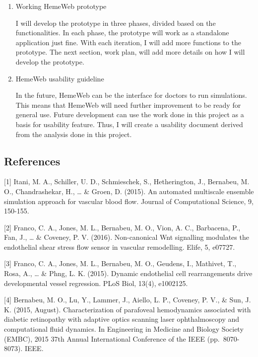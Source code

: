 \documentclass[]{article}
\begin{document}
\begin{enumerate}
\def\labelenumi{\arabic{enumi}.}
\item
  Working HemeWeb prototype

  I will develop the prototype in three phases, divided based on the
  functionalities. In each phase, the prototype will work as a
  standalone application just fine. With each iteration, I will add more
  functions to the prototype. The next section, work plan, will add more
  details on how I will develop the prototype.
\item
  HemeWeb usability guideline

  In the future, HemeWeb can be the interface for doctors to run
  simulations. This means that HemeWeb will need further improvement to
  be ready for general use. Future development can use the work done in
  this project as a basis for usability feature. Thus, I will create a
  usability document derived from the analysis done in this project.
\end{enumerate}

\subsection{References}\label{references}

{[}1{]} Itani, M. A., Schiller, U. D., Schmieschek, S., Hetherington,
J., Bernabeu, M. O., Chandrashekar, H., \ldots{} \& Groen, D. (2015). An
automated multiscale ensemble simulation approach for vascular blood
flow. Journal of Computational Science, 9, 150-155.

{[}2{]} Franco, C. A., Jones, M. L., Bernabeu, M. O., Vion, A. C.,
Barbacena, P., Fan, J., \ldots{} \& Coveney, P. V. (2016). Non-canonical
Wnt signalling modulates the endothelial shear stress flow sensor in
vascular remodelling. Elife, 5, e07727.

{[}3{]} Franco, C. A., Jones, M. L., Bernabeu, M. O., Geudens, I.,
Mathivet, T., Rosa, A., \ldots{} \& Phng, L. K. (2015). Dynamic
endothelial cell rearrangements drive developmental vessel regression.
PLoS Biol, 13(4), e1002125.

{[}4{]} Bernabeu, M. O., Lu, Y., Lammer, J., Aiello, L. P., Coveney, P.
V., \& Sun, J. K. (2015, August). Characterization of parafoveal
hemodynamics associated with diabetic retinopathy with adaptive optics
scanning laser ophthalmoscopy and computational fluid dynamics. In
Engineering in Medicine and Biology Society (EMBC), 2015 37th Annual
International Conference of the IEEE (pp.~8070-8073). IEEE.
\end{document}
